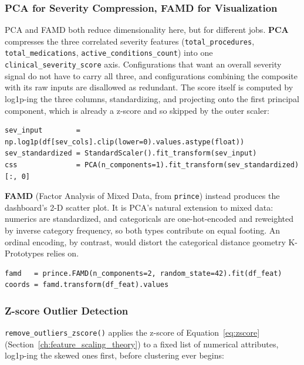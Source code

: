 \subsubsection*{PCA for Severity Compression, FAMD for Visualization}

PCA and FAMD both reduce dimensionality here, but for different jobs. \textbf{PCA} compresses the three correlated severity features (\texttt{total\_procedures}, \texttt{total\_medications}, \texttt{active\_conditions\_count}) into one \texttt{clinical\_severity\_score} axis. Configurations that want an overall severity signal do not have to carry all three, and configurations combining the composite with its raw inputs are disallowed as redundant. The score itself is computed by log1p-ing the three columns, standardizing, and projecting onto the first principal component, which is already a z-score and so skipped by the outer scaler:

\begin{lstlisting}[style=pythonstyle]
sev_input        = np.log1p(df[sev_cols].clip(lower=0).values.astype(float))
sev_standardized = StandardScaler().fit_transform(sev_input)
css              = PCA(n_components=1).fit_transform(sev_standardized)[:, 0]
\end{lstlisting}

\textbf{FAMD} (Factor Analysis of Mixed Data, from \texttt{prince}) instead produces the dashboard's 2-D scatter plot. It is PCA's natural extension to mixed data: numerics are standardized, and categoricals are one-hot-encoded and reweighted by inverse category frequency, so both types contribute on equal footing. An ordinal encoding, by contrast, would distort the categorical distance geometry K-Prototypes relies on.

\begin{lstlisting}[style=pythonstyle]
famd   = prince.FAMD(n_components=2, random_state=42).fit(df_feat)
coords = famd.transform(df_feat).values
\end{lstlisting}

\subsubsection*{Z-score Outlier Detection}
\label{ch:z_score}

\texttt{remove\_outliers\_zscore()} applies the z-score of Equation~\eqref{eq:zscore} (Section~\ref{ch:feature_scaling_theory}) to a fixed list of numerical attributes, log1p-ing the skewed ones first, before clustering ever begins:

